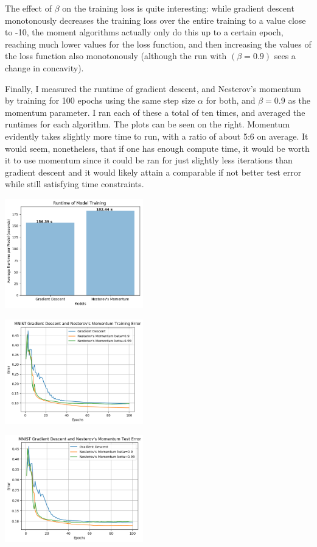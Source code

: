 \documentclass[10pt]{article}
\begin{document}
\begin{multicols}{2}
The effect of $\beta$ on the training loss is quite interesting: while gradient descent monotonously decreases the training loss over the entire training to a value close to -10, the moment algorithms actually only do this up to a certain epoch, reaching much lower values for the loss function, and then increasing the values of the loss function also monotonously (although the run with $(\beta=0.9)$ sees a change in concavity). \par 
Finally, I measured the runtime of gradient descent, and Nesterov's momentum by training for 100 epochs using the same step size $\alpha$ for both, and $\beta=0.9$ as the momentum parameter. I ran each of these a total of ten times, and averaged the runtimes for each algorithm. The plots can be seen on the right. Momentum evidently takes slightly more time to run, with a ratio of about 5:6 on average. It would seem, nonetheless, that if one has enough compute time, it would be worth it to use momentum since it could be ran for just slightly less iterations than gradient descent and it would likely attain a comparable if not better test error while still satisfying time constraints.\par
\begin{center}
    \includegraphics[width=0.45\textwidth]{train_time_part1.png}
\end{center}
\begin{center}
    \includegraphics[width=0.45\textwidth]{GradientDescentandNesterov'sMomentumTrainingError.png}
\end{center}
\begin{center}
    \includegraphics[width=0.45\textwidth]{GradientDescentandNesterov'sMomentumTestError.png}

\end{center}
\end{multicols}
\end{document}
